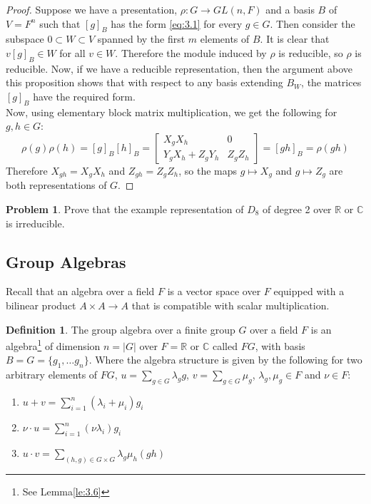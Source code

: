 \documentclass[11pt, notitlepage]{article}
\numberwithin{equation}{section}
\theoremstyle{plain}
\theoremstyle{definition}
\newtheorem{definition}[theorem]{Definition}
\newtheorem{problem}{Problem}
\newcommand{\R}{\mathbb{R}}
\newcommand{\C}{\mathbb{C}}
\begin{document}
\begin{proof}
	Suppose we have a presentation, $\rho:G\rightarrow GL(n,F)$ and a basis $B$ of $V = F^n$ such that $[g]_B$ has the form \ref{eq:3.1} for every $g\in G$. Then consider the subspace $0\subset W\subset V$ spanned by the first $m$ elements of $B$. It is clear that $v[g]_B\in W$ for all $v\in W$. Therefore the module induced by $\rho$ is reducible, so $\rho$ is reducible. Now, if we have a reducible representation, then the argument above this proposition shows that with respect to any basis extending $B_W$, the matrices $[g]_B$ have the required form.\\
	Now, using elementary block matrix multiplication, we get the following for $g,h\in G$: 
	\[\rho(g)\rho(h) = [g]_B[h]_B = \begin{bmatrix}
	X_gX_h & 0\\
	Y_gX_h+Z_gY_h & Z_gZ_h
	\end{bmatrix} = [gh]_B=\rho(gh)\]
	Therefore $X_{gh} = X_gX_h$ and $Z_{gh} = Z_gZ_h$, so the maps $g\mapsto X_g$ and $g\mapsto Z_g$ are both representations of $G$.
\end{proof}

\begin{problem}
	Prove that the example representation of $D_8$ of degree 2 over $\R$ or $\C$ is irreducible.
\end{problem}

\subsection{Group Algebras}

Recall that an algebra over a field $F$ is a  vector space over $F$ equipped with a bilinear product $A\times A\rightarrow A$ that is compatible with scalar multiplication.

\begin{definition}
	The group algebra over a finite group $G$ over a field $F$ is an algebra\footnote{See Lemma\ref{le:3.6} } of dimension $n = |G|$ over $F=\R$ or $\C$ called $FG$, with basis $B=G = \{g_1,\dots g_n\}$. Where the algebra structure is given by the following for two arbitrary elements of $FG$, $u = \sum_{g\in G}\lambda_gg$, $v = \sum_{g\in G}\mu_g$, $\lambda_g,\mu_g\in F$ and $\nu\in F$:
	\begin{enumerate}
		\item $u+v = \sum_{i=1}^n(\lambda_i+\mu_i)g_i$\\
		\item $\nu \cdot u = \sum_{i=1}^{n}(\nu\lambda_i)g_i$\\
		\item $u\cdot v = \sum_{(h,g)\in G\times G}\lambda_g\mu_h(gh)$
	\end{enumerate}
\end{definition}
\end{document}
